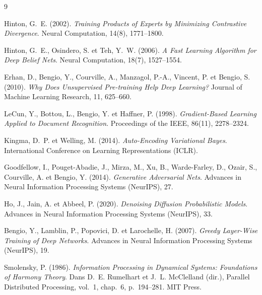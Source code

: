 \documentclass[11pt,a4paper]{article}
\begin{document}
\begin{thebibliography}{9}

Hinton, G.~E. (2002).
\textit{Training Products of Experts by Minimizing Contrastive Divergence}.
Neural Computation, 14(8), 1771--1800.

Hinton, G.~E., Osindero, S. et Teh, Y.~W. (2006).
\textit{A Fast Learning Algorithm for Deep Belief Nets}.
Neural Computation, 18(7), 1527--1554.

Erhan, D., Bengio, Y., Courville, A., Manzagol, P.-A., Vincent, P. et Bengio, S. (2010).
\textit{Why Does Unsupervised Pre-training Help Deep Learning?}
Journal of Machine Learning Research, 11, 625--660.

LeCun, Y., Bottou, L., Bengio, Y. et Haffner, P. (1998).
\textit{Gradient-Based Learning Applied to Document Recognition}.
Proceedings of the IEEE, 86(11), 2278--2324.

Kingma, D.~P. et Welling, M. (2014).
\textit{Auto-Encoding Variational Bayes}.
International Conference on Learning Representations (ICLR).

Goodfellow, I., Pouget-Abadie, J., Mirza, M., Xu, B., Warde-Farley, D., Ozair, S., Courville, A. et Bengio, Y. (2014).
\textit{Generative Adversarial Nets}.
Advances in Neural Information Processing Systems (NeurIPS), 27.

Ho, J., Jain, A. et Abbeel, P. (2020).
\textit{Denoising Diffusion Probabilistic Models}.
Advances in Neural Information Processing Systems (NeurIPS), 33.

Bengio, Y., Lamblin, P., Popovici, D. et Larochelle, H. (2007).
\textit{Greedy Layer-Wise Training of Deep Networks}.
Advances in Neural Information Processing Systems (NeurIPS), 19.

Smolensky, P. (1986).
\textit{Information Processing in Dynamical Systems: Foundations of Harmony Theory}.
Dans D.~E. Rumelhart et J.~L. McClelland (dir.), Parallel Distributed Processing, vol.~1, chap.~6, p.~194--281. MIT Press.

\end{thebibliography}
\end{document}
